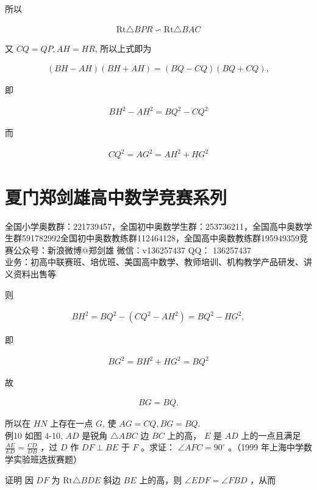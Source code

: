 \documentclass[10pt]{article}
\begin{document}
所以

\begin{align*}
\mathrm{Rt} \triangle B P R \backsim \mathrm{Rt} \triangle B A C
\end{align*}

又 $C Q=Q P, A H=H R$, 所以上式即为

\begin{align*}
(B H-A H)(B H+A H)=(B Q-C Q)(B Q+C Q),
\end{align*}

即

\begin{align*}
B H^{2}-A H^{2}=B Q^{2}-C Q^{2}
\end{align*}

而

\begin{align*}
C Q^{2}=A G^{2}=A H^{2}+H G^{2}
\end{align*}

\section*{夏门郑剑雄高中数学竞赛系列}
全国小学奥数群：221739457，全国初中奥数学生群：253736211，全国高中奥数学生群591782992全国初中奥数教练群112464128，全国高中奥数教练群195949359竞赛公众号：新浪微博@郑剑雄 微信：v136257437 QQ： 136257437\\
业务：初高中联赛班、培优班、美国高中数学、教师培训、机构教学产品研发、讲义资料出售等

则

\begin{align*}
B H^{2}=B Q^{2}-\left(C Q^{2}-A H^{2}\right)=B Q^{2}-H G^{2},
\end{align*}

即

\begin{align*}
B G^{2}=B H^{2}+H G^{2}=B Q^{2}
\end{align*}

故

\begin{align*}
B G=B Q .
\end{align*}

所以在 $H N$ 上存在一点 $G$, 使 $A G=C Q, B G=B Q$.\\
例10 如图 4-10, $A D$ 是锐角 $\triangle A B C$ 边 $B C$ 上的高， $E$ 是 $A D$ 上的一点且满足 $\frac{A E}{E D}=\frac{C D}{D B}$ ，过 $D$ 作 $D F \perp B E$ 于 $F$ 。求证： $\angle A F C=90^{\circ}$ 。（1999 年上海中学数学实验班选拔赛题）

证明 因 $D F$ 为 $\mathrm{Rt} \triangle B D E$ 斜边 $B E$ 上的高，则 $\angle E D F=\angle F B D$ ，从而
\end{document}
